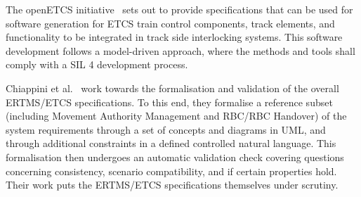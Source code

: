 The openETCS initiative~\cite{openETCS} sets out to provide
specifications that can be used for software generation for ETCS train
control components, track elements, and functionality to be integrated
in track side interlocking systems. This software development follows
a model-driven approach, where the methods and tools shall comply with
a SIL 4 development process. 

Chiappini et al.~\cite{chiappini10} work towards the
formalisation and validation of the overall ERTMS/ETCS
specifications. To this end, they formalise a reference subset
(including Movement Authority Management and RBC/RBC Handover) of the
system requirements through a set of concepts and diagrams in UML, and
through additional constraints in a defined controlled natural
language. This formalisation then undergoes an automatic validation
check covering questions concerning consistency, scenario
compatibility, and if certain properties hold. Their work puts the
ERTMS/ETCS specifications themselves under scrutiny. 




